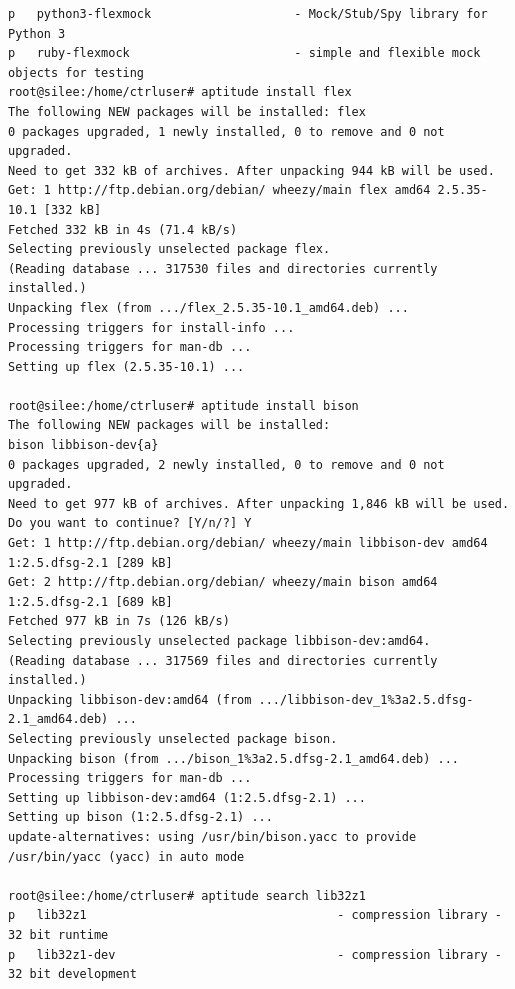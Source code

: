 \documentclass[11pt
  , a4paper
  , article
  , oneside
]{memoir}
\begin{document}
\begin{lstlisting}[style=termstyle]
p   python3-flexmock                    - Mock/Stub/Spy library for Python 3                                 
p   ruby-flexmock                       - simple and flexible mock objects for testing                       
root@silee:/home/ctrluser# aptitude install flex
The following NEW packages will be installed: flex 
0 packages upgraded, 1 newly installed, 0 to remove and 0 not upgraded.
Need to get 332 kB of archives. After unpacking 944 kB will be used.
Get: 1 http://ftp.debian.org/debian/ wheezy/main flex amd64 2.5.35-10.1 [332 kB]
Fetched 332 kB in 4s (71.4 kB/s)
Selecting previously unselected package flex.
(Reading database ... 317530 files and directories currently installed.)
Unpacking flex (from .../flex_2.5.35-10.1_amd64.deb) ...
Processing triggers for install-info ...
Processing triggers for man-db ...
Setting up flex (2.5.35-10.1) ...

root@silee:/home/ctrluser# aptitude install bison
The following NEW packages will be installed:
bison libbison-dev{a} 
0 packages upgraded, 2 newly installed, 0 to remove and 0 not upgraded.
Need to get 977 kB of archives. After unpacking 1,846 kB will be used.
Do you want to continue? [Y/n/?] Y
Get: 1 http://ftp.debian.org/debian/ wheezy/main libbison-dev amd64 1:2.5.dfsg-2.1 [289 kB]
Get: 2 http://ftp.debian.org/debian/ wheezy/main bison amd64 1:2.5.dfsg-2.1 [689 kB]
Fetched 977 kB in 7s (126 kB/s)                                                                                                    
Selecting previously unselected package libbison-dev:amd64.
(Reading database ... 317569 files and directories currently installed.)
Unpacking libbison-dev:amd64 (from .../libbison-dev_1%3a2.5.dfsg-2.1_amd64.deb) ...
Selecting previously unselected package bison.
Unpacking bison (from .../bison_1%3a2.5.dfsg-2.1_amd64.deb) ...
Processing triggers for man-db ...
Setting up libbison-dev:amd64 (1:2.5.dfsg-2.1) ...
Setting up bison (1:2.5.dfsg-2.1) ...
update-alternatives: using /usr/bin/bison.yacc to provide /usr/bin/yacc (yacc) in auto mode

root@silee:/home/ctrluser# aptitude search lib32z1
p   lib32z1                                   - compression library - 32 bit runtime                               
p   lib32z1-dev                               - compression library - 32 bit development                           


\end{lstlisting}
\end{document}
